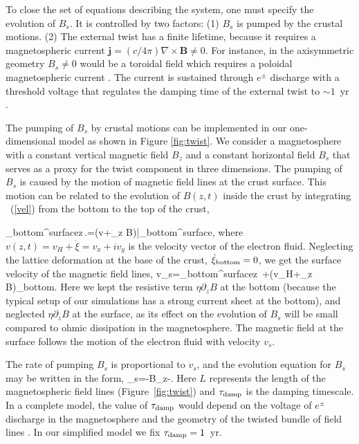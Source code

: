 To close the set of equations describing the system, one must specify the evolution of $B_s$. 
It is controlled by two factors: 
(1) $B_s$ is pumped by the crustal motions.
(2) The external twist has a finite lifetime, because it requires a magnetospheric current ${\mathbf j}=(c/4\pi)\nabla\times{\mathbf B}\neq 0$. 
For instance, in the axisymmetric geometry $B_s\neq 0$ would be a toroidal field which requires a poloidal magnetospheric current \citep{2002ApJ...574..332T}. 
The current is sustained through $e^\pm$ discharge with a threshold voltage that regulates the damping time of the external twist to $\sim 1$~yr \citep{2007ApJ...657..967B}.

The pumping of $B_s$ by crustal motions can be implemented in our one-dimensional model as shown in Figure \ref{fig:twist}.
We consider a magnetosphere with a constant vertical magnetic field $B_z$ and a constant horizontal field $B_s$ that serves as a proxy for the twist component in three dimensions.
The pumping of $B_s$ is caused by the motion of magnetic field lines at the crust surface. 
This motion can be related to the evolution of $B(z,t)$ inside the crust by integrating \Eq~(\ref{vel}) from the bottom to the top of the crust,

\beq
\int\limits_{\rm bottom}^{\rm surface}\md z\,\left.=(v+\eta\partial_z B)\right|_{\rm bottom}^{\rm surface},
\eeq
where $v(z,t)=v_H+\dot{\xi}=v_x+iv_y$ is the velocity vector of the electron fluid. 
Neglecting the lattice deformation at the base of the crust, 
$\dot{\xi}_{\rm bottom}=0$, we get the surface velocity of the magnetic field lines,
\beq
v_s=\int\limits_{\rm bottom}^{\rm surface}\md z\,
+\left(v_H+\eta\partial_z B\right)_{\rm bottom}.
\label{vsurf}
\eeq
Here we kept the resistive term $\eta\partial_z B$ at the bottom (because the typical setup of our simulations has a strong current sheet at the bottom), and neglected $\eta\partial_z B$ at the surface, as its effect on the evolution of $B_s$ will be small compared to ohmic dissipation in the magnetosphere.
The magnetic field at the surface follows the motion of the electron fluid with velocity $v_s$.

The rate of pumping $B_s$ is proportional to $v_s$, and the evolution equation for $B_s$ may be written in the form,
\beq\label{bs}
_s=-B_z-.
\eeq
Here $L$ represents the length of the magnetospheric field lines (Figure~\ref{fig:twist}) and $\tau_{\rm damp}$ is the damping timescale. 
In a complete model, the value of $\tau_{\rm damp}$ would depend on the voltage of $e^\pm$ discharge in the magnetosphere and the geometry of the twisted bundle of field lines \citep{2009ApJ...703.1044B}.  
In our simplified model we fix $\tau_{\rm damp}=1$~yr.

